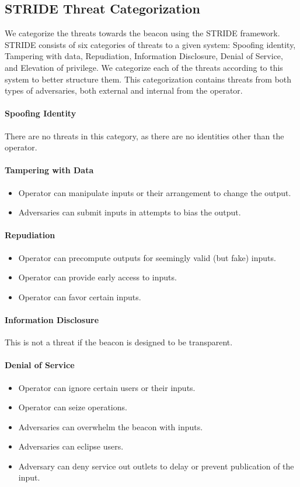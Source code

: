 \subsection{STRIDE Threat Categorization}
We categorize the threats towards the beacon using the STRIDE framework. STRIDE consists of six categories of threats to a given system: Spoofing identity, Tampering with data, Repudiation, Information Disclosure, Denial of Service, and Elevation of privilege. We categorize each of the threats according to this system to better structure them. This categorization contains threats from both types of adversaries, both external and internal from the operator.

\paragraph{Spoofing Identity} There are no threats in this category, as there are no identities other than the operator.
\paragraph{Tampering with Data}
\begin{itemize}
    \item Operator can manipulate inputs or their arrangement to change the output.
    \item Adversaries can submit inputs in attempts to bias the output.
\end{itemize}
\paragraph{Repudiation}
\begin{itemize}
    \item Operator can precompute outputs for seemingly valid (but fake) inputs.
    \item Operator can provide early access to inputs.
    \item Operator can favor certain inputs.
\end{itemize}
\paragraph{Information Disclosure} This is not a threat if the beacon is designed to be transparent.
\paragraph{Denial of Service}
\begin{itemize}
    \item Operator can ignore certain users or their inputs.
    \item Operator can seize operations.
    \item Adversaries can overwhelm the beacon with inputs.
    \item Adversaries can eclipse users.
    \item Adversary can deny service out outlets to delay or prevent publication of the input.
\end{itemize}
